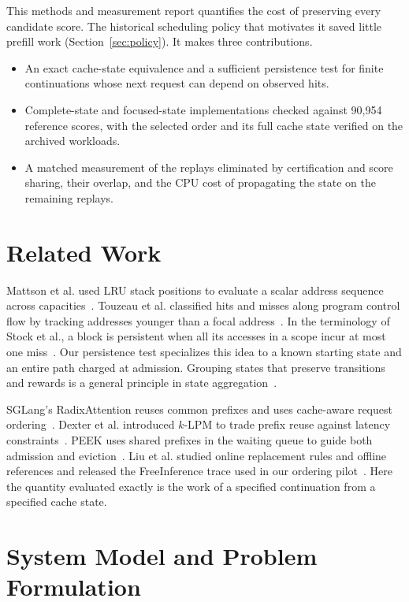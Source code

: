 \documentclass[11pt,letterpaper]{article}
\begin{document}
This methods and measurement report quantifies the cost of preserving every candidate score. The historical scheduling policy that motivates it saved little prefill work (Section~\ref{sec:policy}). It makes three contributions.
\begin{itemize}
\item An exact cache-state equivalence and a sufficient persistence test for finite continuations whose next request can depend on observed hits.
\item Complete-state and focused-state implementations checked against 90,954 reference scores, with the selected order and its full cache state verified on the archived workloads.
\item A matched measurement of the replays eliminated by certification and score sharing, their overlap, and the CPU cost of propagating the state on the remaining replays.
\end{itemize}

\section{Related Work}

Mattson et al. used LRU stack positions to evaluate a scalar address sequence across capacities~\cite{mattson}. Touzeau et al. classified hits and misses along program control flow by tracking addresses younger than a focal address~\cite{touzeau}. In the terminology of Stock et al., a block is persistent when all its accesses in a scope incur at most one miss~\cite{stock}. Our persistence test specializes this idea to a known starting state and an entire path charged at admission. Grouping states that preserve transitions and rewards is a general principle in state aggregation~\cite{givan}.

SGLang's RadixAttention reuses common prefixes and uses cache-aware request ordering~\cite{sglang}. Dexter et al. introduced $k$-LPM to trade prefix reuse against latency constraints~\cite{dexter}. PEEK uses shared prefixes in the waiting queue to guide both admission and eviction~\cite{peek}. Liu et al. studied online replacement rules and offline references and released the FreeInference trace used in our ordering pilot~\cite{fancy}. Here the quantity evaluated exactly is the work of a specified continuation from a specified cache state.

\section{System Model and Problem Formulation}
\end{document}
